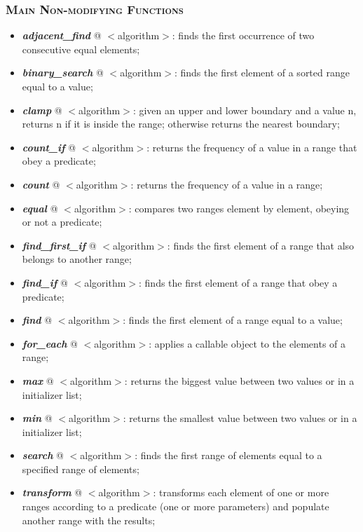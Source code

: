 \documentclass[10pt]{article}
\begin{document}
\begin{multicols*}{4}
{\subsubsection*{\textsc{Main Non-modifying Functions}} 
\begin{itemize}[leftmargin=*,topsep=0.25pt]
  \setlength\itemsep{-1.8pt}
	\item  \emph{\textbf{adjacent\_find}} @ $<$algorithm$>$: finds the first occurrence of two consecutive equal elements;
	\item  \emph{\textbf{binary\_search}} @ $<$algorithm$>$: finds the first element of a sorted range equal to a value;  
	\item  \emph{\textbf{clamp}} @ $<$algorithm$>$: given an upper and lower boundary and a value n, returns n if it is inside the range; otherwise returns the nearest boundary;  
	\item  \emph{\textbf{count\_if}} @ $<$algorithm$>$: returns the frequency of a value in a range that obey a predicate;
	\item  \emph{\textbf{count}} @ $<$algorithm$>$: returns the frequency of a value in a range; 
	\item  \emph{\textbf{equal}} @ $<$algorithm$>$: compares two ranges element by element, obeying or not a predicate;  
	\item  \emph{\textbf{find\_first\_if}} @ $<$algorithm$>$: finds the first element of a range that also belongs to another range;  
	\item  \emph{\textbf{find\_if}} @ $<$algorithm$>$: finds the first element of a range that obey a predicate;
	\item  \emph{\textbf{find}} @ $<$algorithm$>$: finds the first element of a range equal to a value; 
	\item  \emph{\textbf{for\_each}} @ $<$algorithm$>$: applies a callable object to the elements of a range;
	\item  \emph{\textbf{max}} @ $<$algorithm$>$: returns the biggest value between two values or in a initializer list;  
	\item  \emph{\textbf{min}} @ $<$algorithm$>$: returns the smallest value between two values or in a initializer list;  
	\item  \emph{\textbf{search}} @ $<$algorithm$>$: finds the first range of elements equal to a specified range of elements;  
	\item  \emph{\textbf{transform}} @ $<$algorithm$>$: transforms each element of one or more ranges according to a predicate (one or more parameters) and populate another range with the results;  
\end{itemize}

}
\end{multicols*}
\end{document}
